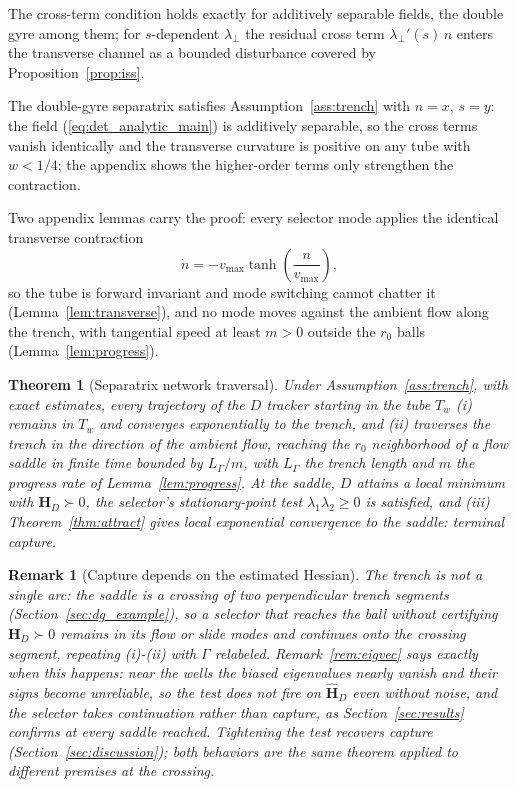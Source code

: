 \documentclass[lettersize,journal]{IEEEtran}
\newtheorem{theorem}{Theorem}
\newtheorem{remark}{Remark}
\begin{document}
The cross-term condition holds exactly for additively separable
fields, the double gyre among them; for $s$-dependent $\lambda_\perp$
the residual cross term $\lambda_\perp'(s)\,n$ enters the transverse
channel as a bounded disturbance covered by
Proposition~\ref{prop:iss}.

The double-gyre separatrix satisfies Assumption~\ref{ass:trench} with
$n = x$, $s = y$: the field (\ref{eq:det_analytic_main}) is additively
separable, so the cross terms vanish identically and the transverse
curvature is positive on any tube with $w < 1/4$; the appendix shows the
higher-order terms only strengthen the contraction.

Two appendix lemmas carry the proof: every selector mode applies the
identical transverse contraction
\begin{equation}
    \dot{n} = -v_{\max}\tanh\!\left(\frac{n}{v_{\max}}\right),
    \label{eq:n_dynamics}
\end{equation}
so the tube is forward invariant and mode switching cannot chatter it
(Lemma~\ref{lem:transverse}), and no mode moves against the ambient flow
along the trench, with tangential speed at least $m > 0$ outside the
$r_0$ balls (Lemma~\ref{lem:progress}).

\begin{theorem}[Separatrix network traversal]
\label{thm:separatrix}
Under Assumption~\ref{ass:trench}, with exact estimates, every
trajectory of the $D$ tracker starting in the tube $T_w$ (i) remains in
$T_w$ and converges exponentially to the trench, and (ii) traverses the
trench in the direction of the ambient flow, reaching the $r_0$
neighborhood of a flow saddle in finite time bounded by $L_\Gamma/m$,
with $L_\Gamma$ the trench length and $m$ the progress rate of
Lemma~\ref{lem:progress}. At the saddle, $D$ attains a local minimum
with $\mathbf{H}_D \succ 0$, the selector's stationary-point test
$\lambda_1\lambda_2 \geq 0$ is satisfied, and (iii)
Theorem~\ref{thm:attract} gives local exponential convergence to the
saddle: terminal capture.
\end{theorem}

\begin{remark}[Capture depends on the estimated Hessian]
\label{rem:capture_gap}
The trench is not a single arc: the saddle is a crossing of two
perpendicular trench segments (Section~\ref{sec:dg_example}), so a
selector that reaches the ball without certifying $\mathbf{H}_D \succ
0$ remains in its flow or slide modes and continues onto the crossing
segment, repeating (i)-(ii) with $\Gamma$ relabeled.
Remark~\ref{rem:eigvec} says exactly when this happens: near the wells
the biased eigenvalues nearly vanish and their signs become unreliable,
so the test does not fire on $\hat{\mathbf{H}}_D$ even without noise,
and the selector takes continuation rather than capture, as
Section~\ref{sec:results} confirms at every saddle reached. Tightening
the test recovers capture (Section~\ref{sec:discussion}); both
behaviors are the same theorem applied to different premises at the
crossing.
\end{remark}
\end{document}
